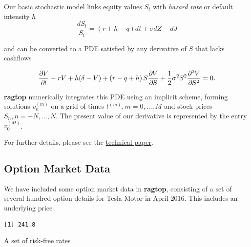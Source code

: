 \documentclass[]{article}
\newenvironment{Shaded}{\begin{snugshade}}{\end{snugshade}}
\newcommand{\KeywordTok}[1]{\textcolor[rgb]{0.13,0.29,0.53}{\textbf{#1}}}
\newcommand{\DataTypeTok}[1]{\textcolor[rgb]{0.13,0.29,0.53}{#1}}
\newcommand{\DecValTok}[1]{\textcolor[rgb]{0.00,0.00,0.81}{#1}}
\newcommand{\OperatorTok}[1]{\textcolor[rgb]{0.81,0.36,0.00}{\textbf{#1}}}
\newcommand{\NormalTok}[1]{#1}
\begin{document}
Our basic stochastic model links equity values \(S_t\) with \emph{hazard
rate} or default intensity \(h\) \[
    \frac{dS_t}{S_t}=(r+h-q) dt + \sigma dZ - dJ
\]

and can be converted to a PDE satisfied by any derivative of \(S\) that
lacks cashflows

\[
{{\frac{\partial \mspace{-1.0mu} V}{\partial \mspace{-1.0mu} t}}} -rV + h(\delta-V) + \left(r-q+h\right)S{{\frac{\partial \mspace{-1.0mu} V}{\partial \mspace{-1.0mu} S}}}+\frac12 \sigma^2 S^2 {{\frac{\partial^2 \mspace{-1.0mu} V}{\partial \mspace{-1.0mu} S^2}}}=0.
\]

\textbf{ragtop} numerically integrates this PDE using an implicit
scheme, forming solutions \(v^{(m)}_n\) on a grid of times
\(t^{(m)}, m=0,\dots,M\) and stock prices \(S_n, n=-N,\dots,N\). The
present value of our derivative is represented by the entry
\(v^{(M)}_0\).

For further details, please see the
\href{http://thureoscapital.com/ragtop.pdf}{technical paper}.

\subsection{Option Market Data}\label{option-market-data}

We have included some option market data in \textbf{ragtop}, consisting
of a set of several hundred option details for Tesla Motor in April
2016. This includes an underlying price

\begin{Shaded}
\end{Shaded}

\begin{verbatim}
[1] 241.8
\end{verbatim}

A set of risk-free rates

\begin{Shaded}
\end{Shaded}
\end{document}
